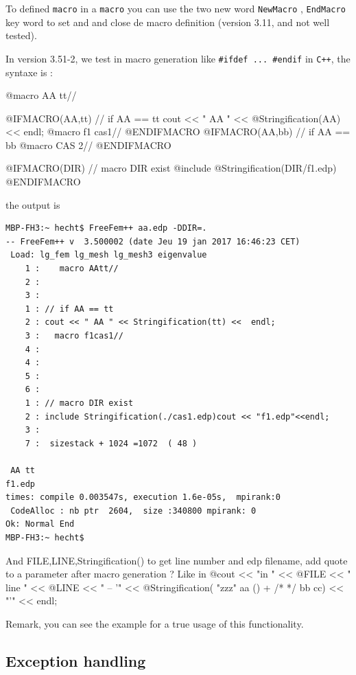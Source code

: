 \documentclass[a4paper,twoside,12pt]{book}
\def\hrefexample#1#2{\href{http://www.freefem.org/ff++/ff++/examples++-#1/#2}{\color{purple}{\texttt{#2 in #1}}}}
\begin{document}
To defined \texttt{macro} in a \texttt{macro} you can use 
the two new word \texttt{NewMacro} , \texttt{EndMacro} key word to set and
and close de macro definition (version 3.11, and not well tested). 

In version 3.51-2, we test in macro generation like \verb!#ifdef ... #endif! in \texttt{C++},
the syntaxe is : 

\bFF
@macro AA  tt// \hfilll

@IFMACRO(AA,tt)
// if AA == tt \hfilll
cout << " AA " << @Stringification(AA) <<  endl;  
@macro f1 cas1// \hfilll
@ENDIFMACRO
@IFMACRO(AA,bb)
// if AA == bb \hfilll
@macro CAS 2// \hfilll
@ENDIFMACRO

@IFMACRO(DIR)
// macro DIR exist \hfilll
@include @Stringification(DIR/f1.edp)
@ENDIFMACRO

\eFF

the output is

\begin{verbatim}
MBP-FH3:~ hecht$ FreeFem++ aa.edp -DDIR=.
-- FreeFem++ v  3.500002 (date Jeu 19 jan 2017 16:46:23 CET)
 Load: lg_fem lg_mesh lg_mesh3 eigenvalue 
    1 :    macro AAtt//
    2 : 
    3 : 
    1 : // if AA == tt
    2 : cout << " AA " << Stringification(tt) <<  endl;  
    3 :   macro f1cas1//
    4 : 
    4 : 
    5 : 
    6 : 
    1 : // macro DIR exist 
    2 : include Stringification(./cas1.edp)cout << "f1.edp"<<endl; 
    3 : 
    7 :  sizestack + 1024 =1072  ( 48 )

 AA tt
f1.edp
times: compile 0.003547s, execution 1.6e-05s,  mpirank:0
 CodeAlloc : nb ptr  2604,  size :340800 mpirank: 0
Ok: Normal End
MBP-FH3:~ hecht$ 

\end{verbatim}

And 
    FILE,LINE,Stringification() to get line number and edp filename,
    add quote to a parameter after macro generation ? 
    Like in 
\bFF    
    @cout << "in " << @FILE << " line " << @LINE << "    -- '" 
         << @Stringification( "zzz" aa  () {} +  /* */  bb cc) << "'" << endl;
\eFF


Remark, you can see  the example \hrefexample{tutorial}{Stokes-macro2d-3d.edp} for a true 
usage of  this functionality.  
\subsection{Exception handling}
\end{document}
